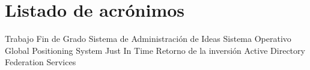 \chapter{Listado de acrónimos}

{\small
\begin{acronym}[XXXXXXXX]
	 {Trabajo Fin de Grado}
	 {Sistema de Administración de Ideas}
	 {Sistema Operativo}
	 {Global Positioning System}
	 {Just In Time}
	 {Retorno de la inversión}
	 {Active Directory Federation Services}
\end{acronym}
}




